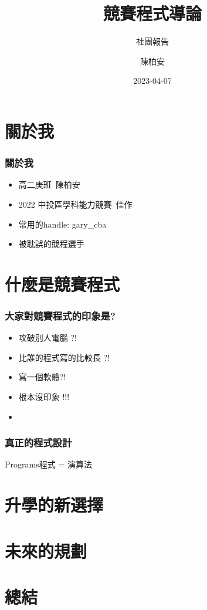 \documentclass[mathserif]{beamer}
\title{競賽程式導論}
\author{陳柏安}
\subtitle{社團報告}
\date{2023-04-07}
\begin{document}
    \frame{\titlepage}

    \begin {frame}
        \tableofcontents 
    \end {frame}

        \section{關於我}

    \begin {frame}
    \frametitle{關於我}
        \begin {itemize}
        \item 高二庚班\ 陳柏安
        \item 2022 中投區學科能力競賽\ 佳作
        \item 常用的handle: gary\_cba
        \item 被耽誤的競程選手
        \end {itemize}
    \end {frame}

        \section{什麼是競賽程式}
        
    \begin {frame}
        \frametitle{大家對競賽程式的印象是?}
        \begin {itemize}
            \item 攻破別人電腦 ?!
            \pause
            \item 比誰的程式寫的比較長 ?!
            \pause
            \item 寫一個軟體?!
            \pause 
            \item 根本沒印象 !!!
            \pause
            \item 
        \end {itemize}
    \end{frame}

    \begin{frame}
        \frametitle{真正的程式設計}
        Programs程式 = 演算法 
    \end{frame}

    \section{升學的新選擇}

    \section{未來的規劃}

    \section{總結}
\end{document}
